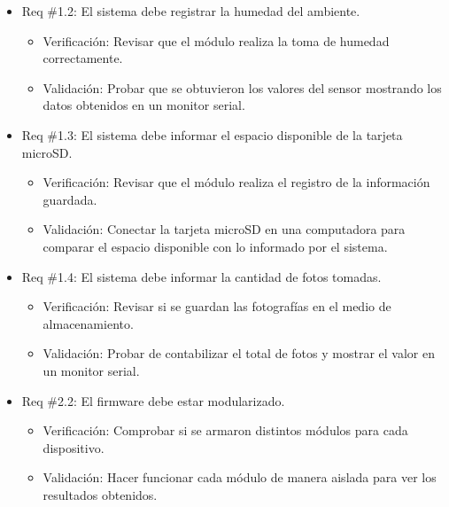 \documentclass[
11pt, %
]{charter}
\begin{document}
\begin{itemize} 
\item Req \#1.2: El sistema debe registrar la humedad del ambiente.
\begin{itemize}
	\item Verificación: Revisar que el módulo realiza la toma de humedad correctamente.
	\item Validación: Probar que se obtuvieron los valores del sensor mostrando los datos obtenidos en un monitor serial.
\end{itemize}
\end{itemize}

\begin{itemize} 
\item Req \#1.3: El sistema debe informar el espacio disponible de la tarjeta microSD.
\begin{itemize}
	\item Verificación: Revisar que el módulo realiza el registro de la información guardada.
	\item Validación: Conectar la tarjeta microSD en una computadora para comparar el espacio disponible con lo informado por el sistema.
\end{itemize}
\end{itemize}

\begin{itemize} 
\item Req \#1.4: El sistema debe informar la cantidad de fotos tomadas.
\begin{itemize}
	\item Verificación: Revisar si se guardan las fotografías en el medio de almacenamiento.
	\item Validación: Probar de contabilizar el total de fotos y mostrar el valor en un monitor serial.
\end{itemize}
\end{itemize}

\begin{itemize} 
\item Req \#2.2: El firmware debe estar modularizado.
\begin{itemize}
	\item Verificación: Comprobar si se armaron distintos módulos para cada dispositivo.
	\item Validación: Hacer funcionar cada módulo de manera aislada para ver los resultados obtenidos.
\end{itemize}
\end{itemize}
\end{document}
